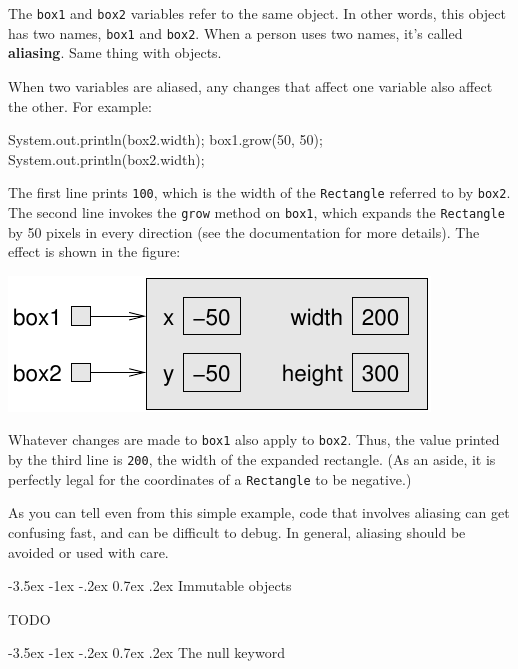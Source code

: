 \documentclass[12pt]{book}
\makeatletter
\renewcommand{\section}{\@startsection {section}{1}{\z@}%
    {-3.5ex \@plus -1ex \@minus -.2ex}%
    {0.7ex \@plus.2ex}%
    {\normalfont\Large\bfseries}}
\theoremstyle{exercise}
\newcommand{\java}[1]{\lstinline{#1}} %
\makeatother
\begin{document}

The \java{box1} and \java{box2} variables refer to the same object.
In other words, this object has two names, \java{box1} and \java{box2}.
When a person uses two names, it's called {\bf aliasing}.
Same thing with objects.

When two variables are aliased, any changes that affect one variable also affect the other.
For example:

\begin{code}
    System.out.println(box2.width);
    box1.grow(50, 50);
    System.out.println(box2.width);
\end{code}

The first line prints \java{100}, which is the width of the \java{Rectangle} referred to by \java{box2}.
The second line invokes the \java{grow} method on \java{box1}, which expands the \java{Rectangle} by 50 pixels in every direction (see the documentation for more details).
The effect is shown in the figure:

\includegraphics{figs/aliasing2.pdf}

Whatever changes are made to \java{box1} also apply to \java{box2}.
Thus, the value printed by the third line is \java{200}, the width of the expanded rectangle.
(As an aside, it is perfectly legal for the coordinates of a \java{Rectangle} to be negative.)

As you can tell even from this simple example, code that involves aliasing can get confusing fast, and can be difficult to debug.
In general, aliasing should be avoided or used with care.


\section{Immutable objects}

TODO


\section{The null keyword}

\end{document}
